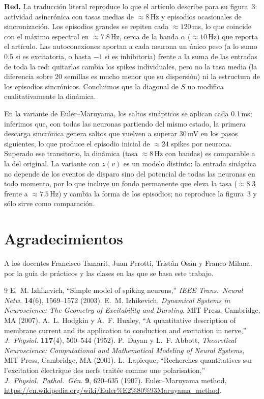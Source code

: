 \documentclass[10pt,a4paper,twocolumn]{article}
\begin{document}
\textbf{Red.} La traducción literal reproduce lo que el artículo describe para su
figura~3: actividad asincrónica con tasas medias de $\approx8$\,Hz y episodios
ocasionales de sincronización. Los episodios grandes se repiten cada $\approx120$\,ms,
lo que coincide con el máximo espectral en $\approx\num{7.8}$\,Hz, cerca de la banda
$\alpha$ ($\approx10$\,Hz) que reporta el artículo. Las autoconexiones aportan a cada
neurona un único peso (a lo sumo \num{0.5} si es excitatoria, o hasta $-1$ si es
inhibitoria) frente a la suma de las entradas de toda la red: quitarlas cambia los
spikes individuales, pero no la tasa media (la diferencia sobre 20 semillas es mucho
menor que su dispersión) ni la estructura de los episodios sincrónicos. Concluimos que
la diagonal de $S$ no modifica cualitativamente la dinámica.

En la variante de Euler--Maruyama, los saltos sinápticos se aplican cada
\num{0.1}\,ms; inferimos que, con todas las neuronas partiendo del mismo estado, la
primera descarga sincrónica genera saltos que vuelven a superar 30\,mV en los pasos
siguientes, lo que produce el episodio inicial de $\approx24$ spikes por neurona.
Superado ese transitorio, la dinámica (tasa $\approx8$\,Hz con bandas) es comparable a
la del original. La variante con $z(v)$ es un modelo distinto: la entrada sináptica no
depende de los eventos de disparo sino del potencial de todas las neuronas en todo
momento, por lo que incluye un fondo permanente que eleva la tasa
($\approx\num{8.3}$ frente a $\approx\num{7.5}$\,Hz) y cambia la forma de los
episodios; no reproduce la figura~3 y sólo sirve como comparación.

\section*{Agradecimientos}
A los docentes Francisco Tamarit, Juan Perotti, Tristán Osán y Franco Milana, por la
guía de prácticos y las clases en las que se basa este trabajo.

\begin{thebibliography}{9}\small
\setlength{\itemsep}{0pt}
  E.~M. Izhikevich, ``Simple model of spiking neurons,''
  \emph{IEEE Trans.\ Neural Netw.} \textbf{14}(6), 1569--1572 (2003).
  E.~M. Izhikevich, \emph{Dynamical Systems in Neuroscience: The Geometry of
  Excitability and Bursting}, MIT Press, Cambridge, MA (2007).
  A.~L. Hodgkin y A.~F. Huxley, ``A quantitative description of membrane
  current and its application to conduction and excitation in nerve,''
  \emph{J.\ Physiol.} \textbf{117}(4), 500--544 (1952).
  P.~Dayan y L.~F. Abbott, \emph{Theoretical Neuroscience: Computational and
  Mathematical Modeling of Neural Systems}, MIT Press, Cambridge, MA (2001).
  L.~Lapicque, ``Recherches quantitatives sur l'excitation électrique des nerfs
  traitée comme une polarisation,'' \emph{J.\ Physiol.\ Pathol.\ Gén.} \textbf{9},
  620--635 (1907).
  Euler--Maruyama method,
  \url{https://en.wikipedia.org/wiki/Euler\%E2\%80\%93Maruyama_method}.
\end{thebibliography}
\end{document}
